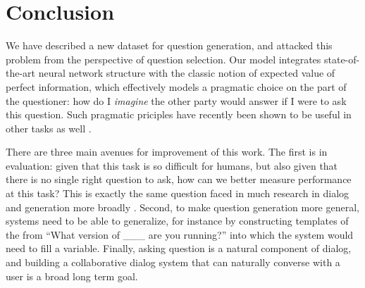 \documentclass[11pt,a4paper]{article}
\begin{document}
\section{Conclusion}

We have described a new dataset for question generation, and attacked this problem from the perspective of question selection.
Our model integrates state-of-the-art neural network structure with the classic notion of expected value of perfect information, which effectively models a pragmatic choice on the part of the questioner: how do I \emph{imagine} the other party would answer if I were to ask this question. Such pragmatic priciples have recently been shown to be useful in other tasks as well \cite{golland2010game,smith2013learning,orita2015discourse,andreas2016reasoning}.

There are three main avenues for improvement of this work.
The first is in evaluation: given that this task is so difficult for humans, but also given that there is no single right question to ask, how can we better measure performance at this task?
This is exactly the same question faced in much research in dialog and generation more broadly \cite{paek2001empirical,lowe2015ubuntu,liu2016not,kannan2017adversarial}.
Second, to make question generation more general, systems need to be able to generalize, for instance by constructing templates of the from ``What version of \_\_\_ are you running?'' into which the system would need to fill a variable. Finally, asking question is a natural component of dialog, and building a collaborative dialog system that can naturally converse with a user is a broad long term goal.



\end{document}

